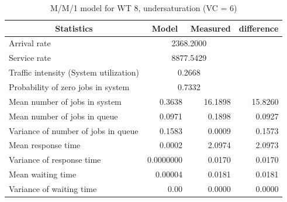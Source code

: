 \documentclass[11pt,a4paper]{article}
\begin{document}
\begin{table}[H]
	\centering
	\caption{M/M/1 model for WT 8, undersaturation (VC = 6)}
		\begin{tabular}{|l|r|r|r|}
		\hline
		\multicolumn{1}{|c|}{Statistics} & \multicolumn{1}{c|}{Model} & \multicolumn{1}{c|}{Measured} & \multicolumn{1}{c|}{difference} \\ \hline
		Arrival rate & \multicolumn{ 2}{c|}{2368.2000} & \multicolumn{1}{l|}{} \\ \hline
		Service rate & \multicolumn{ 2}{c|}{8877.5429} & \multicolumn{1}{l|}{} \\ \hline
		Traffic intensity (System utilization) & \multicolumn{ 2}{c|}{0.2668} & \multicolumn{1}{l|}{} \\ \hline
		Probability of zero jobs in system & \multicolumn{ 2}{c|}{0.7332} & \multicolumn{1}{l|}{} \\ \hline
		Mean number of jobs in system & 0.3638 & 16.1898 & 15.8260 \\ \hline
		Mean number of jobs in queue & 0.0971 & 0.1898 & 0.0927 \\ \hline
		Variance of number of jobs in queue & 0.1583 & 0.0009 & 0.1573 \\ \hline
		Mean response time & 0.0002 & 2.0974 & 2.0973 \\ \hline
		Variance of response time & 0.0000000 & 0.0170 & 0.0170 \\ \hline
		Mean waiting time & 0.00004 & 0.0181 & 0.0181 \\ \hline
		Variance of waiting time & 0.00 & 0.0000 & 0.0000 \\ \hline
	\end{tabular}
	\label{}

\end{table}
\end{document}
